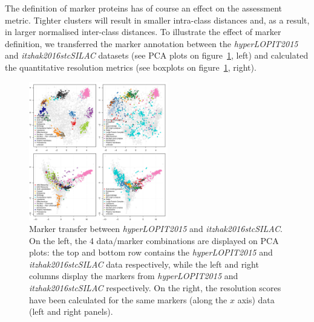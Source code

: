 \documentclass[12pt]{article}\usepackage[]{graphicx}\usepackage[]{color}
\begin{document}
The definition of marker proteins has of course an effect on the
assessment metric. Tighter clusters will result in smaller intra-class
distances and, as a result, in larger normalised inter-class
distances. To illustrate the effect of marker definition, we
transferred the marker annotation between the \textit{hyperLOPIT2015}
and \textit{itzhak2016stcSILAC} datasets (see PCA plots on
figure~\ref{fig:mrkswtch}, left) and calculated the quantitative
resolution metrics (see boxplots on figure~\ref{fig:mrkswtch}, right).

\begin{figure}[h]
  \centering
  \includegraphics[width = 0.54\textwidth]{mrkswtch-pca.pdf}
  \caption{Marker transfer between \textit{hyperLOPIT2015} and
    \textit{itzhak2016stcSILAC}. On the left, the 4 data/marker
    combinations are displayed on PCA plots: the top and bottom row
    contains the \textit{hyperLOPIT2015} and
    \textit{itzhak2016stcSILAC} data respectively, while the left and
    right columns display the markers from \textit{hyperLOPIT2015} and
    \textit{itzhak2016stcSILAC} respectively. On the right, the
    resolution scores have been calculated for the same markers (along
    the $x$ axis) data (left and right panels). }
  \label{fig:mrkswtch}
\end{figure}
\end{document}
